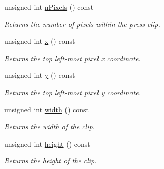 \begin{CompactItemize}
unsigned int \hyperlink{class_clip_23ad153e40b62cc9178ff6b439ad7d92}{nPixels} () const 
\begin{CompactList}\small\item\em Returns the number of pixels within the press clip. \item\end{CompactList}\item 
unsigned int \hyperlink{class_clip_de984337b7b13fb63a3d3b1797b544c8}{x} () const 
\begin{CompactList}\small\item\em Returns the top left-most pixel x coordinate. \item\end{CompactList}\item 
unsigned int \hyperlink{class_clip_998a62506ffab457184ec7083cb154e4}{y} () const 
\begin{CompactList}\small\item\em Returns the top left-most pixel y coordinate. \item\end{CompactList}\item 
unsigned int \hyperlink{class_clip_d3e816599913e4051e5d50fae17ecd76}{width} () const 
\begin{CompactList}\small\item\em Returns the width of the clip. \item\end{CompactList}\item 
unsigned int \hyperlink{class_clip_393710a6b136f400dd5c900f8831e1a8}{height} () const 
\begin{CompactList}\small\item\em Returns the height of the clip. \item\end{CompactList}\end{CompactItemize}
